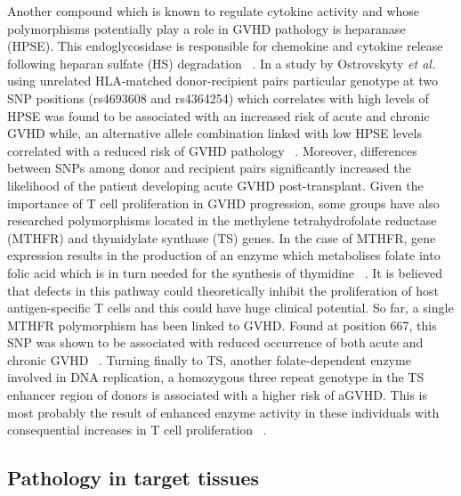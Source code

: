 Another compound which is known to regulate cytokine activity and whose polymorphisms potentially play a role in GVHD pathology is heparanase (HPSE). This endoglycosidase is responsible for chemokine and cytokine release following heparan sulfate (HS) degradation ~\autocite{Ost2015,Tin2013}. In a study by Ostrovskyty \textit{et al.} using unrelated HLA-matched donor-recipient pairs particular genotype at two SNP positions (rs4693608 and rs4364254) which correlates with high levels of HPSE was found to be associated with an increased risk of acute and chronic GVHD while, an alternative allele combination linked with low HPSE levels correlated with a reduced risk of GVHD pathology ~\autocite{Ost2015}. Moreover, differences between SNPs among donor and recipient pairs significantly increased the likelihood of the patient developing acute GVHD post-transplant. Given the importance of T cell proliferation in GVHD progression, some groups have also researched polymorphisms located in the methylene tetrahydrofolate reductase (MTHFR) and thymidylate synthase (TS) genes. In the case of MTHFR, gene expression results in the production of an enzyme which metabolises folate into folic acid which is in turn needed for the synthesis of thymidine ~\autocite{Tin2013}. It is believed that defects in this pathway could theoretically inhibit the proliferation of host antigen-specific T cells and this could have huge clinical potential. So far, a single MTHFR polymorphism has been linked to GVHD. Found at position 667, this SNP was shown to be associated with reduced occurrence of both acute and chronic GVHD ~\autocite{Tin2013}. Turning finally to TS, another folate-dependent enzyme involved in DNA replication, a homozygous three repeat genotype in the TS enhancer region of donors is associated with a higher risk of aGVHD. This is most probably the result of enhanced enzyme activity in these individuals with consequential increases in T cell proliferation ~\autocite{Tin2013}.


\subsection{Pathology in target tissues}

